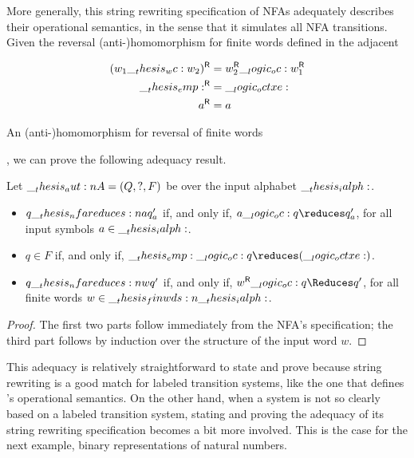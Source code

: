 More generally, this string rewriting specification of \acp{NFA} adequately describes their operational semantics, in the sense that it simulates all \ac{NFA} transitions.
Given the reversal (anti-)\-homo\-morph\-ism for finite words defined in the adjacent %
\begin{marginfigure}
  \begin{align*}
    \rev*{w_1 \wc w_2} &= \rev{w_2} \oc \rev{w_1} \\
    \rev{\emp} &= \octxe \\
    \rev{a} &= a
  \end{align*}
  \caption{An (anti-)\-homo\-morph\-ism for reversal of finite words}\label{fig:string-rewriting:reversal}
\end{marginfigure}%
, we can prove the following adequacy result.
\begin{theorem}\label{thm:nfa-adequacy-string-rewriting}
  Let $\__thesis_aut:n {A} = (Q, ?, F)$ be  over the input alphabet $\__thesis_ialph:$.
  \begin{itemize}[nosep]
  \item
    $q \nfareduces[a] q'_a$ if, and only if, $a \oc q \reduces q'_a$, for all input symbols $a \in \__thesis_ialph:$.
  \item
    $q \in F$ if, and only if, $\emp \oc q \reduces (\octxe)$.%
  \item
    $q \nfareduces[w] q'$ if, and only if, $\rev{w} \oc q \Reduces q'$, for all finite words $w \in \__thesis_finwds:n {\__thesis_ialph:}$.
  \end{itemize}  
\end{theorem}
\begin{proof}
  The first two parts follow immediately from the \ac{NFA}'s specification; the third part follows by induction over the structure of the input word $w$.
\end{proof}

This adequacy  is relatively straightforward to state and prove because string rewriting is a good match for labeled transition systems, like the one that defines 's operational semantics.
On the other hand, when a system is not so clearly based on a labeled transition system, stating and proving the adequacy of its string rewriting specification becomes a bit more involved.
This is the case for the next example, binary representations of natural numbers.

